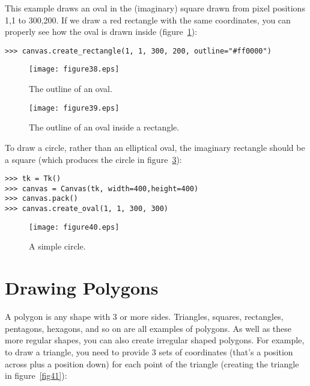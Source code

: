 This example draws an oval in the (imaginary) square drawn from pixel positions 1,1 to 300,200. If we draw a red rectangle with the same coordinates, you can properly see how the oval is drawn inside (figure~\ref{fig38}):

\begin{listing}
\begin{verbatim}
>>> canvas.create_rectangle(1, 1, 300, 200, outline="#ff0000")
\end{verbatim}
\end{listing}

\begin{figure}
\begin{center}
\texttt{[image: figure38.eps]}
\end{center}
\caption{The outline of an oval.}\label{fig38}
\end{figure}

\begin{figure}
\begin{center}
\texttt{[image: figure39.eps]}
\end{center}
\caption{The outline of an oval inside a rectangle.}\label{fig39}
\end{figure}

\noindent
To draw a circle, rather than an elliptical oval, the imaginary rectangle should be a square (which produces the circle in figure~\ref{fig40}):

\begin{listing}
\begin{verbatim}
>>> tk = Tk()
>>> canvas = Canvas(tk, width=400,height=400)
>>> canvas.pack()
>>> canvas.create_oval(1, 1, 300, 300)
\end{verbatim}
\end{listing}

\begin{figure}
\begin{center}
\texttt{[image: figure40.eps]}
\end{center}
\caption{A simple circle.}\label{fig40}
\end{figure}

\section{Drawing Polygons}

A polygon is any shape with 3 or more sides. Triangles, squares, rectangles, pentagons, hexagons, and so on are all examples of polygons. As well as these more regular shapes, you can also create irregular shaped polygons. For example, to draw a triangle, you need to provide 3 sets of coordinates (that's a position across plus a position down) for each point of the triangle (creating the triangle in figure~\ref{fig41}):


